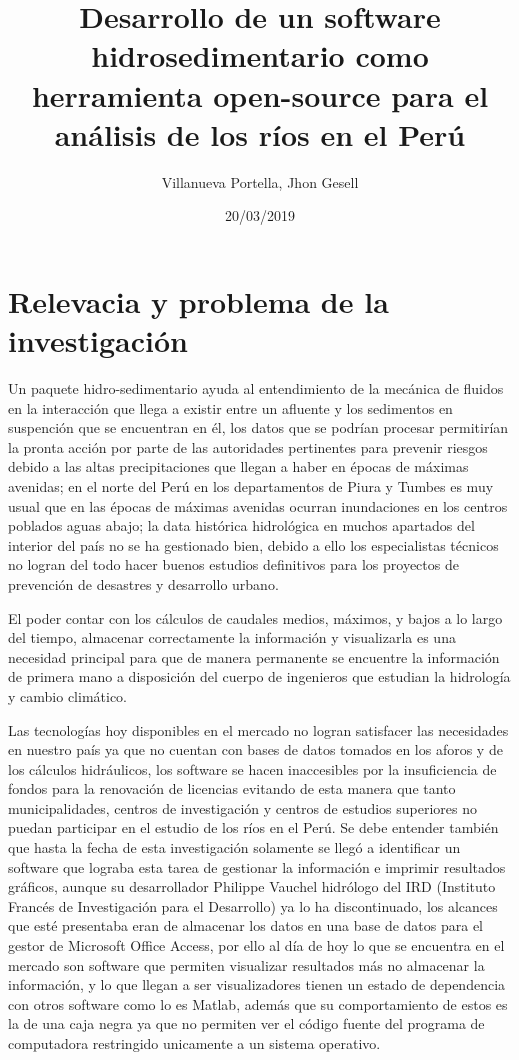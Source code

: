 \documentclass[12pt,a4paper]{report}
\begin{document}
\title{Desarrollo de un software hidrosedimentario como herramienta open-source para el análisis de los ríos en el Perú}
\author{Villanueva Portella, Jhon Gesell}
\date{20/03/2019}
\maketitle
\section{Relevacia y problema de la investigación}
Un paquete hidro-sedimentario ayuda al entendimiento de la mecánica de fluidos en la interacción que llega a existir entre un afluente y los sedimentos en suspención que se encuentran en él, los datos que se podrían procesar permitirían la pronta acción por parte de las autoridades pertinentes para prevenir riesgos debido a las altas precipitaciones que llegan a haber en épocas de máximas avenidas; en el norte del Perú en los departamentos de Piura y Tumbes es muy usual que en las épocas de máximas avenidas ocurran inundaciones en los centros poblados aguas abajo; la data histórica hidrológica en muchos apartados del interior del país no se ha gestionado bien, debido a ello los especialistas técnicos no logran del todo hacer buenos estudios definitivos para los proyectos de prevención de desastres y desarrollo urbano.

El poder contar con los cálculos de caudales medios, máximos, y bajos a lo largo del tiempo, almacenar correctamente la información y visualizarla es una necesidad principal para que de manera permanente se encuentre la información de primera mano a disposición del cuerpo de ingenieros que estudian la hidrología y cambio climático.

Las tecnologías hoy disponibles en el mercado no logran satisfacer las necesidades en nuestro país ya que no cuentan con bases de datos tomados en los aforos y de los cálculos hidráulicos, los software se hacen inaccesibles por la insuficiencia de fondos para la renovación de licencias evitando de esta manera que tanto municipalidades, centros de investigación y centros de estudios superiores no puedan participar en el estudio de los ríos en el Perú. Se debe entender también que hasta la fecha de esta investigación solamente se llegó a identificar un software que lograba esta tarea de gestionar la información e imprimir resultados gráficos, aunque su desarrollador Philippe Vauchel hidrólogo del IRD (Instituto Francés de Investigación para el Desarrollo) ya lo ha discontinuado, los alcances que esté presentaba eran de almacenar los datos en una base de datos para el gestor de Microsoft Office Access, por ello al día de hoy lo que se encuentra en el mercado son software que permiten visualizar resultados más no almacenar la información, y lo que llegan a ser visualizadores tienen un estado de dependencia con otros software como lo es Matlab, además que su comportamiento de estos es la de una caja negra ya que no permiten ver el código fuente del programa de computadora restringido unicamente a un sistema operativo.
\end{document}
